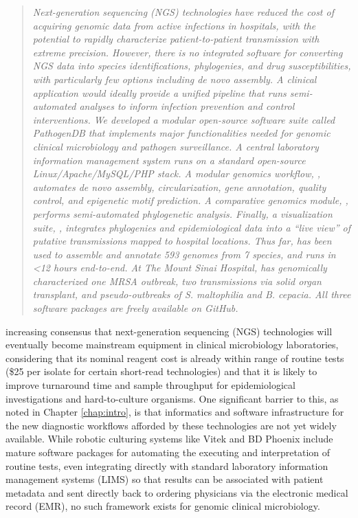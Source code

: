 \begin{quote}
\emph{Next-generation sequencing (NGS) technologies have reduced the cost of acquiring genomic data from active infections in hospitals, with the potential to rapidly characterize patient-to-patient transmission with extreme precision. However, there is no integrated software for converting NGS data into species identifications, phylogenies, and drug susceptibilities, with particularly few options including \emph{de novo} assembly. A clinical application would ideally provide a unified pipeline that runs semi-automated analyses to inform infection prevention and control interventions. We developed a modular open-source software suite called PathogenDB that implements major functionalities needed for genomic clinical microbiology and pathogen surveillance. A central laboratory information management system runs on a standard open-source Linux/Apache/MySQL/PHP stack. A modular genomics workflow, \pathogendbpipeline, automates de novo assembly, circularization, gene annotation, quality control, and epigenetic motif prediction. A comparative genomics module, \pathogendbcomparison, performs semi-automated phylogenetic analysis. Finally, a visualization suite, \pathogendbviz, integrates phylogenies and epidemiological data into a ``live view'' of putative transmissions mapped to hospital locations. Thus far, \pathogendbpipeline{} has been used to assemble and annotate 593 genomes from 7 species, and runs in <12 hours end-to-end. At The Mount Sinai Hospital, \pathogendbcomparison{} has genomically characterized one MRSA outbreak, two transmissions via solid organ transplant, and pseudo-outbreaks of \emph{S. maltophilia} and \emph{B. cepacia}. All three software packages are freely available on GitHub.
}
\end{quote}

 increasing consensus that next-generation sequencing (NGS) technologies will eventually become mainstream equipment in clinical microbiology laboratories, considering that its nominal reagent cost is already within range of routine tests (\$25 per isolate for certain short-read technologies) and that it is likely to improve turnaround time and sample throughput for epidemiological investigations and hard-to-culture organisms.\autocite{Didelot2012,Koser2012} One significant barrier to this, as noted in Chapter \ref{chap:intro}, is that informatics and software infrastructure for the new diagnostic workflows afforded by these technologies are not yet widely available. While robotic culturing systems like Vitek and BD Phoenix include mature software packages for automating the executing and interpretation of routine tests, even integrating directly with standard laboratory information management systems (LIMS) so that results can be associated with patient metadata and sent directly back to ordering physicians via the electronic medical record (EMR), no such framework exists for genomic clinical microbiology.


